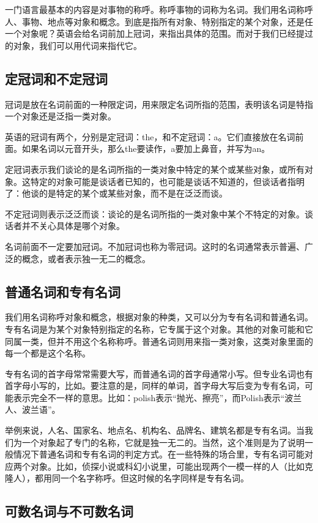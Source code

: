 \documentclass[10.5pt, a4paper]{ctexbook} %
\begin{document}
一门语言最基本的内容是对事物的称呼。称呼事物的词称为名词。我们用名词称呼人、事物、地点等对象和概念。到底是指所有对象、特别指定的某个对象，还是任一个对象呢？英语会给名词前加上冠词，来指出具体的范围。而对于我们已经提过的对象，我们可以用代词来指代它。

\subsection{定冠词和不定冠词}

冠词是放在名词前面的一种限定词，用来限定名词所指的范围，表明该名词是特指一个对象还是泛指一类对象。

英语的冠词有两个，分别是定冠词：the，和不定冠词：a。它们直接放在名词前面。如果名词以元音开头，那么the要读作，a要加上鼻音，并写为an。

定冠词表示我们谈论的是名词所指的一类对象中特定的某个或某些对象，或所有对象。这特定的对象可能是谈话者已知的，也可能是谈话不知道的，但谈话者指明了：他谈的是特定的某个或某些对象，而不是在泛泛而谈。

不定冠词则表示泛泛而谈：谈论的是名词所指的一类对象中某个不特定的对象。谈话者并不关心具体是哪个对象。

名词前面不一定要加冠词。不加冠词也称为零冠词。这时的名词通常表示普遍、广泛的概念，或者表示独一无二的概念。

\subsection{普通名词和专有名词}

我们用名词称呼对象和概念，根据对象的种类，又可以分为专有名词和普通名词。专有名词是为某个对象特别指定的名称，它专属于这个对象。其他的对象可能和它同属一类，但并不用这个名称称呼。普通名词则用来指一类对象，这类对象里面的每一个都是这个名称。

专有名词的首字母常常需要大写，而普通名词的首字母通常小写。但专业名词也有首字母小写的，比如。要注意的是，同样的单词，首字母大写后变为专有名词，可能表示完全不一样的意思。比如：polish表示“抛光、擦亮”，而Polish表示“波兰人、波兰语”。

举例来说，人名、国家名、地点名、机构名、品牌名、建筑名都是专有名词。当我们为一个对象起了专门的名称，它就是独一无二的。当然，这个准则是为了说明一般情况下普通名词和专有名词的判定方式。在一些特殊的场合里，专有名词可能对应两个对象。比如，侦探小说或科幻小说里，可能出现两个一模一样的人（比如克隆人），都用同一个名字称呼。但这时候的名字同样是专有名词。

\subsection{可数名词与不可数名词}
\end{document}
